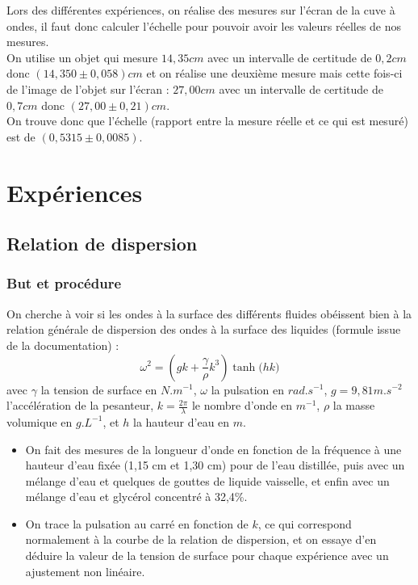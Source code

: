 \documentclass{report}
\begin{document}
Lors des différentes expériences, on réalise des mesures sur l'écran de la cuve à ondes, il faut donc calculer l'échelle pour pouvoir avoir les valeurs réelles de nos mesures. \\

On utilise un objet qui mesure $14,35 cm$ avec un intervalle de certitude de $0,2 cm$ donc $(14,350 \pm 0,058) cm$ et on réalise une deuxième mesure mais cette fois-ci de l'image de l'objet sur l'écran : $27,00 cm$ avec un intervalle de certitude de $0,7 cm$ donc $(27,00 \pm 0,21) cm$.\\

On trouve donc que l'échelle (rapport entre la mesure réelle et ce qui est mesuré) est de $(0,5315 \pm 0,0085)$.




\chapter{Expériences}
\section{Relation de dispersion}

\subsection{But et procédure}
 On cherche à voir si les ondes à la surface des différents fluides obéissent bien à la relation générale de dispersion des ondes à la surface des liquides (formule issue de la documentation) : $$\omega^2=(gk+\frac{\gamma}{\rho}k^3) \tanh{(hk})$$
 avec $\gamma$ la tension de surface en $N.m^{-1}$, $\omega$ la pulsation en $rad.s^{-1}$, $g = 9,81 m.s^{-2}$ l'accélération de la pesanteur,  $k = \frac{2 \pi}{\lambda}$ le nombre d'onde en $m^{-1}$, $\rho$ la masse volumique en $g.L^{-1}$, et $h$ la hauteur d'eau en $m$.

\begin{itemize}[label=]
    \item On fait des mesures de la longueur d'onde en fonction de la fréquence à une hauteur d'eau fixée (1,15 cm et 1,30 cm) pour de l'eau distillée, puis avec un mélange d'eau et quelques de gouttes de liquide vaisselle, et enfin avec un mélange d'eau et glycérol concentré à 32,4\%.
    \item On trace la pulsation au carré en fonction de $k$, ce qui correspond normalement à la courbe de la relation de dispersion, et on essaye d'en déduire la valeur de la tension de surface pour chaque expérience avec un ajustement non linéaire.
\end{itemize}
\end{document}

